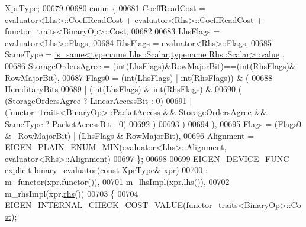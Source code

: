 \begin{DoxyCode}
      \hyperlink{group___core___module_class_eigen_1_1_cwise_binary_op}{XprType};
00679   
00680   \textcolor{keyword}{enum} \{
00681     CoeffReadCost = \hyperlink{struct_eigen_1_1internal_1_1evaluator}{evaluator<Lhs>::CoeffReadCost} + 
      \hyperlink{struct_eigen_1_1internal_1_1evaluator}{evaluator<Rhs>::CoeffReadCost} + 
      \hyperlink{struct_eigen_1_1internal_1_1functor__traits}{functor\_traits<BinaryOp>::Cost},
00682     
00683     LhsFlags = \hyperlink{struct_eigen_1_1internal_1_1evaluator}{evaluator<Lhs>::Flags},
00684     RhsFlags = \hyperlink{struct_eigen_1_1internal_1_1evaluator}{evaluator<Rhs>::Flags},
00685     SameType = \hyperlink{struct_eigen_1_1internal_1_1is__same}{is\_same<typename Lhs::Scalar,typename Rhs::Scalar>::value}
      ,
00686     StorageOrdersAgree = (int(LhsFlags)&\hyperlink{group__flags_gae4f56c2a60bbe4bd2e44c5b19cbe8762}{RowMajorBit})==(\textcolor{keywordtype}{int}(RhsFlags)&
      \hyperlink{group__flags_gae4f56c2a60bbe4bd2e44c5b19cbe8762}{RowMajorBit}),
00687     Flags0 = (\textcolor{keywordtype}{int}(LhsFlags) | int(RhsFlags)) & (
00688         HereditaryBits
00689       | (\textcolor{keywordtype}{int}(LhsFlags) & \textcolor{keywordtype}{int}(RhsFlags) &
00690            ( (StorageOrdersAgree ? \hyperlink{group__flags_ga4b983a15d57cd55806df618ac544d09e}{LinearAccessBit} : 0)
00691            | (\hyperlink{struct_eigen_1_1internal_1_1functor__traits}{functor\_traits<BinaryOp>::PacketAccess} && 
      StorageOrdersAgree && SameType ? \hyperlink{group__flags_ga1a306a438e1ab074e8be59512e887b9f}{PacketAccessBit} : 0)
00692            )
00693         )
00694      ),
00695     Flags = (Flags0 & ~\hyperlink{group__flags_gae4f56c2a60bbe4bd2e44c5b19cbe8762}{RowMajorBit}) | (LhsFlags & \hyperlink{group__flags_gae4f56c2a60bbe4bd2e44c5b19cbe8762}{RowMajorBit}),
00696     Alignment = EIGEN\_PLAIN\_ENUM\_MIN(\hyperlink{struct_eigen_1_1internal_1_1evaluator}{evaluator<Lhs>::Alignment},
      \hyperlink{struct_eigen_1_1internal_1_1evaluator}{evaluator<Rhs>::Alignment})
00697   \};
00698 
00699   EIGEN\_DEVICE\_FUNC \textcolor{keyword}{explicit} \hyperlink{struct_eigen_1_1internal_1_1binary__evaluator}{binary\_evaluator}(\textcolor{keyword}{const} XprType& xpr)
00700     : m\_functor(xpr.\hyperlink{group___core___module_acc4efe306adbdc0c95cc1c73a8cf81e4}{functor}()),
00701       m\_lhsImpl(xpr.\hyperlink{group___core___module_a0f73e7585dfb54d41c1983e1e6a4b269}{lhs}()), 
00702       m\_rhsImpl(xpr.\hyperlink{group___core___module_a3a61cbdf6d1adaa62f012045b04b6d09}{rhs}())  
00703   \{
00704     EIGEN\_INTERNAL\_CHECK\_COST\_VALUE(\hyperlink{struct_eigen_1_1internal_1_1functor__traits}{functor\_traits<BinaryOp>::Cost});

\end{DoxyCode}

